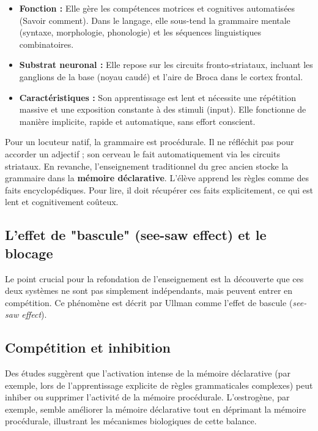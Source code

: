 \begin{itemize}\item \textbf{Fonction :} Elle gère les compétences motrices et cognitives automatisées (\og Savoir comment\fg{}). Dans le langage, elle sous-tend la grammaire mentale (syntaxe, morphologie, phonologie) et les séquences linguistiques combinatoires.\item \textbf{Substrat neuronal :} Elle repose sur les circuits fronto-striataux, incluant les ganglions de la base (noyau caudé) et l'aire de Broca dans le cortex frontal.\cite{II-3-3-ref20}\item \textbf{Caractéristiques :} Son apprentissage est lent et nécessite une répétition massive et une exposition constante à des stimuli (input). Elle fonctionne de manière implicite, rapide et automatique, sans effort conscient.\cite{II-3-3-ref21}\end{itemize}Pour un locuteur natif, la grammaire est procédurale. Il ne \og réfléchit\fg{} pas pour accorder un
adjectif ; son cerveau le fait automatiquement via les circuits striataux. En revanche,
l'enseignement traditionnel du grec ancien stocke la grammaire dans la \textbf{mémoire déclarative}.
L'élève apprend les règles comme des faits encyclopédiques. Pour lire, il doit récupérer ces faits
explicitement, ce qui est lent et cognitivement coûteux.\cite{II-3-3-ref19}



\subsection{L'effet de "bascule" (see-saw effect) et le blocage}

Le point crucial pour la refondation de l'enseignement est la découverte que ces deux systèmes ne
sont pas simplement indépendants, mais peuvent entrer en compétition. Ce phénomène est décrit par
Ullman comme l'effet de \og bascule\fg{} (\textit{see-saw effect}).\cite{II-3-3-ref23}



\subsection{Compétition et inhibition}

Des études suggèrent que l'activation intense de la mémoire déclarative (par exemple, lors de
l'apprentissage explicite de règles grammaticales complexes) peut inhiber ou supprimer l'activité de
la mémoire procédurale. L'œstrogène, par exemple, semble améliorer la mémoire déclarative tout en
déprimant la mémoire procédurale, illustrant les mécanismes biologiques de cette
balance.\cite{II-3-3-ref25}

